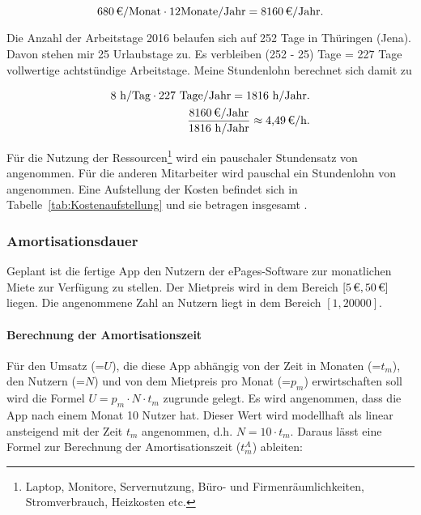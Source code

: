 \begin{equation}
	\eur{680}/\mbox{Monat} \cdot 12 \mbox{Monate/Jahr} = \eur{8160}/\mbox{Jahr}.
\end{equation}

Die Anzahl der Arbeitstage 2016 belaufen sich auf 252 Tage in Thüringen (Jena). Davon stehen mir 25 Urlaubstage zu. Es verbleiben (252 - 25) Tage = 227 Tage vollwertige  achtstündige Arbeitstage. Meine Stundenlohn berechnet sich damit zu

\begin{eqnarray}
	8 \mbox{ h/Tag} \cdot 227 \mbox{ Tage/Jahr} = 1816 \mbox{ h/Jahr} .\\
	\frac{\eur{8160} \mbox{/Jahr}}{1816 \mbox{ h/Jahr}} \approx \eur{4,49}\mbox{/h}.
\end{eqnarray}

Für die Nutzung der Ressourcen\footnote{Laptop, Monitore, Servernutzung, Büro- und Firmenräumlichkeiten, Stromverbrauch, Heizkosten etc.} wird ein pauschaler Stundensatz von  angenommen. Für die anderen Mitarbeiter wird pauschal ein Stundenlohn von  angenommen. Eine Aufstellung der Kosten befindet sich in Tabelle~\ref{tab:Kostenaufstellung} und sie betragen insgesamt .

\subsubsection{Amortisationsdauer}
\label{sec:Amortisationsdauer}

Geplant ist die fertige App den Nutzern der ePages-Software zur monatlichen Miete zur Verfügung zu stellen. Der Mietpreis wird in dem Bereich $[\mbox{\eur{5}},\mbox{\eur{50}}]$ liegen. Die angenommene Zahl an Nutzern liegt in dem Bereich $[\mbox{1},\mbox{20000}]$.

\paragraph{Berechnung der Amortisationszeit}
Für den Umsatz (=$U$), die diese App abhängig von der Zeit in Monaten (=$t_m$), den Nutzern (=$N$) und von dem Mietpreis pro Monat (=$p_m$) erwirtschaften soll wird die Formel $U = p_m \cdot N \cdot t_m$ zugrunde gelegt. Es wird angenommen, dass die App nach einem Monat 10 Nutzer hat. Dieser Wert wird modellhaft als linear ansteigend mit der Zeit $t_m$ angenommen, d.h. $N = 10 \cdot t_m$. Daraus lässt eine Formel zur Berechnung der Amortisationszeit ($t^{A}_m$) ableiten:

